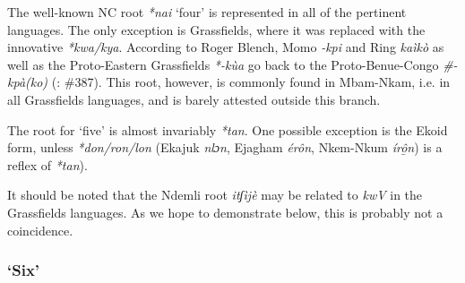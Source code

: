 The well-known NC root \textit{*nai} `four' is represented in all of the pertinent languages. The only exception is Grassfields, where it was replaced with the innovative \textit{*kwa/kya}. According to Roger Blench, Momo \textit{-kpi} and Ring \textit{kaìkò} as well as the Proto-Eastern Grassfields \textit{*-kùa} go back to the Proto-Benue-Congo \textit{\#-kpà(ko)} (\citealt{Blench2004}: \#387). This root, however, is commonly found in Mbam-Nkam, i.e. in all Grassfields languages, and is barely attested outside this branch.

The root for `five' is almost invariably \textit{*tan}. One possible exception is the Ekoid form, unless \textit{*don/ron/lon} (Ekajuk \textit{nlɔn}, Ejagham \textit{ér{\^{o}}n}, Nkem-Nkum \textit{íro{\^{̱}}n}) is a reflex of \textit{*tan}).

It should be noted that the Ndemli root \textit{itʃìjè} may be related to \textit{kwV} in the Grassfields languages. As we hope to demonstrate below, this is probably not a coincidence. 

 
\subsubsection{`Six'}\label{sec:3.1.1.4}

